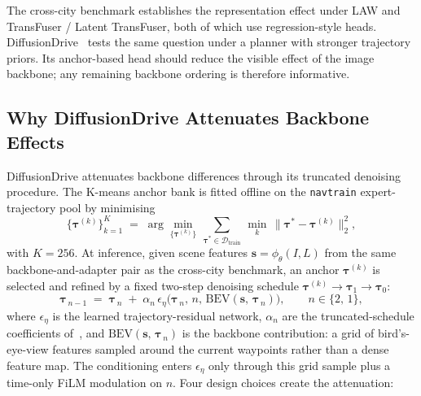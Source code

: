 The cross-city benchmark establishes the representation effect under LAW and TransFuser / Latent TransFuser, both of which use regression-style heads. DiffusionDrive~\cite{jia-diffusiondrive-2025} tests the same question under a planner with stronger trajectory priors. Its anchor-based head should reduce the visible effect of the image backbone; any remaining backbone ordering is therefore informative.

\subsection{Why DiffusionDrive Attenuates Backbone Effects}
\label{sec:meth-dd-why}

DiffusionDrive attenuates backbone differences through its truncated denoising procedure. The K-means anchor bank is fitted offline on the \texttt{navtrain} expert-trajectory pool by minimising
\begin{equation}
\label{eq:dd-kmeans}
\bigl\{\boldsymbol\tau^{(k)}\bigr\}_{k=1}^{K} \;=\; \arg\min_{\{\boldsymbol\tau^{(k)}\}}\, \sum_{\boldsymbol\tau^\ast \in \mathcal{D}_\text{train}}\, \min_{k}\, \bigl\lVert \boldsymbol\tau^\ast - \boldsymbol\tau^{(k)} \bigr\rVert_2^2,
\end{equation}
with $K = 256$. At inference, given scene features $\mathbf{s} = \phi_\theta(I, L)$ from the same backbone-and-adapter pair as the cross-city benchmark, an anchor $\boldsymbol\tau^{(k)}$ is selected and refined by a fixed two-step denoising schedule $\boldsymbol\tau^{(k)} \!\to\! \boldsymbol\tau_1 \!\to\! \boldsymbol\tau_0$:
\begin{equation}
\label{eq:dd-denoise}
\boldsymbol\tau_{\,n-1} \;=\; \boldsymbol\tau_{\,n} \;+\; \alpha_n\,\epsilon_\eta\!\bigl(\boldsymbol\tau_{\,n},\, n,\, \mathrm{BEV}(\mathbf{s},\, \boldsymbol\tau_{\,n})\bigr),
\qquad n \in \{2,\,1\},
\end{equation}
where $\epsilon_\eta$ is the learned trajectory-residual network, $\alpha_n$ are the truncated-schedule coefficients of~\cite{jia-diffusiondrive-2025}, and $\mathrm{BEV}(\mathbf{s},\, \boldsymbol\tau_{\,n})$ is the backbone contribution: a grid of bird's-eye-view features sampled around the current waypoints rather than a dense feature map. The conditioning enters $\epsilon_\eta$ only through this grid sample plus a time-only FiLM modulation on $n$. Four design choices create the attenuation:
